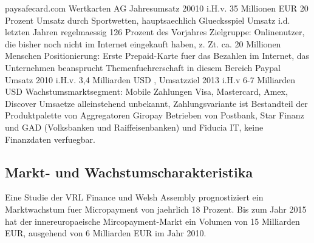 paysafecard.com Wertkarten AG   \newline \newline
Jahresumsatz 20010 i.H.v. 35 Millionen EUR 
20 Prozent Umsatz durch Sportwetten, hauptsaechlich Gluecksspiel 
Umsatz i.d. letzten Jahren regelmaessig 126 Prozent des Vorjahres \cite{d1} \newline
\newline Zielgruppe: Onlinenutzer, die bisher noch nicht im Internet eingekauft haben, z.
Zt. ca. 20 Millionen Menschen \newline \newline
Positionierung: Erste Prepaid-Karte fuer das Bezahlen im Internet, das
Unternehmen beansprucht Themenfuehrerschaft in diesem Bereich \cite{d2} \newline
\newline
Paypal  \newline \newline
Umsatz 2010 i.H.v. 3,4 Milliarden USD \cite{d3}, \cite{d4}\newline
Umsatzziel 2013 i.H.v 6-7 Milliarden USD \cite{d4}\newline 
Wachstumsmarktsegment: Mobile Zahlungen \cite{d5}\newline \newline
Visa, Mastercard, Amex, Discover \newline \newline
Umsaetze alleinstehend unbekannt, Zahlungsvariante ist Bestandteil der 
Produktpalette von Aggregatoren \newline \newline
Giropay\newline \newline
Betrieben von Postbank, Star Finanz und GAD (Volksbanken und Raiffeisenbanken)
und Fiducia IT, keine Finanzdaten verfuegbar.\newline \newline

\subsection{Markt- und Wachstumscharakteristika}

Eine Studie der VRL Finance und Welsh Assembly \cite{da2} prognostiziert ein
Marktwachstum fuer Micropayment von jaehrlich 18 Prozent. Bis zum Jahr 2015 hat 
der innereuropaeische Mircopayment-Markt ein Volumen von 15 Milliarden EUR,
ausgehend von 6 Milliarden EUR im Jahr 2010. \newline 

